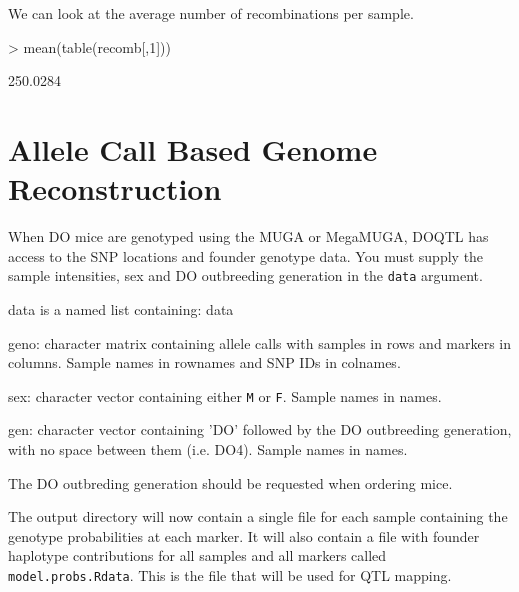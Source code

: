 \documentclass{article}
\begin{document}
We can look at the average number of recombinations per sample.

\begin{Schunk}
\begin{Sinput}
> mean(table(recomb[,1]))
\end{Sinput}
\begin{Soutput}
[1] 250.0284
\end{Soutput}
\end{Schunk}

\section{Allele Call Based Genome Reconstruction}

When DO mice are genotyped using the MUGA or MegaMUGA, DOQTL has access to the SNP locations and 
founder genotype data. You must supply the sample intensities, sex and DO outbreeding generation
in the \texttt{data} argument. 

data is a named list containing:
data\begin{description}
  \item{geno: character matrix containing allele calls with samples in rows and markers in columns. Sample names in rownames and SNP IDs in colnames.}
  \item{sex: character vector containing either \texttt{M} or \texttt{F}. Sample names in names.}
  \item{gen: character vector containing 'DO' followed by the DO outbreeding generation, with no space between them (i.e. DO4). Sample names in names.}
\end{description}

The DO outbreding generation should be requested when ordering mice.

\begin{Schunk}
\end{Schunk}

The output directory will now contain a single file for each sample containing the genotype probabilities at each marker. It will also contain a file with founder haplotype contributions for all samples and all markers called \texttt{model.probs.Rdata}. This is the file that will be used for QTL mapping.
\end{document}
